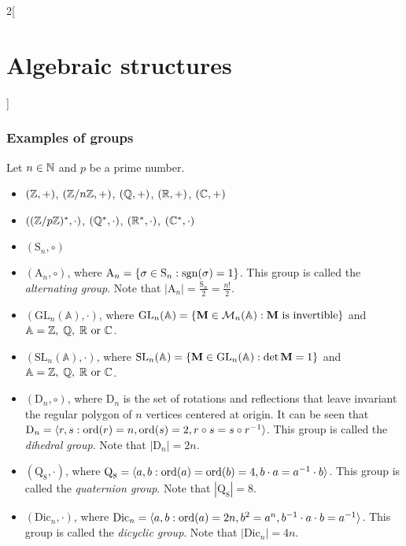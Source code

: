 \documentclass[../../../main_math.tex]{subfiles}
\begin{document}
\begin{multicols}{2}[\section{Algebraic structures}]
  \subsubsection{Examples of groups}\label{AS:examples}
  Let $n\in\mathbb{N}$ and $p$ be a prime number.
  \begin{itemize}
    \item $(\mathbb{Z},+)$, $(\mathbb{Z}/n\mathbb{Z},+)$, $(\mathbb{Q},+)$, $(\mathbb{R},+)$, $(\mathbb{C},+)$
    \item $((\mathbb{Z}/p\mathbb{Z})^*,\cdot)$, $(\mathbb{Q}^*,\cdot)$, $(\mathbb{R}^*,\cdot)$, $(\mathbb{C}^*,\cdot)$
    \item $(\text{S}_n,\circ)$
    \item $(\text{A}_n,\circ)$, where $\text{A}_n=\{\sigma\in \text{S}_n:\operatorname{sgn}(\sigma)=1\}$. This group is called the \emph{alternating group}. Note that $|\text{A}_n|=\frac{\text{S}_n}{2}=\frac{n!}{2}$.
    \item $(\text{GL}_n(\mathbb{A}),\cdot)$, where $\text{GL}_n(\mathbb{A})=\{\boldsymbol{\mathrm{M}}\in\mathcal{M}_n(\mathbb{A}):\boldsymbol{\mathrm{M}}\text{ is invertible}\}$ and $\mathbb{A}=\mathbb{Z},\;\mathbb{Q},\;\mathbb{R}\text{ or }\mathbb{C}$.
    \item $(\text{SL}_n(\mathbb{A}),\cdot)$, where $\text{SL}_n(\mathbb{A})=\{\boldsymbol{\mathrm{M}}\in\text{GL}_n(\mathbb{A}):\det\boldsymbol{\mathrm{M}}=1\}$ and $\mathbb{A}=\mathbb{Z},\;\mathbb{Q},\;\mathbb{R}\text{ or }\mathbb{C}$.
    \item $(\text{D}_n,\circ)$, where $\text{D}_n$ is the set of rotations and reflections that leave invariant the regular polygon of $n$ vertices centered at origin. It can be seen that $\text{D}_n=\langle r,s:\operatorname{ord}(r)=n,\operatorname{ord}(s)=2,r\circ s=s\circ r^{-1}\rangle$. This group is called the \emph{dihedral group}. Note that $|\text{D}_n|=2n$.
    \item $(\text{Q}_8,\cdot)$, where $\text{Q}_8=\langle a,b:\operatorname{ord}(a)=\operatorname{ord}(b)=4,b\cdot a=a^{-1}\cdot b\rangle$. This group is called the \emph{quaternion group}. Note that $|\text{Q}_8|=8$.
    \item $(\text{Dic}_n,\cdot)$, where $\text{Dic}_n=\langle a,b:\operatorname{ord}(a)=2n,b^2=a^n,b^{-1}\cdot a\cdot b=a^{-1}\rangle$. This group is called the \emph{dicyclic group}. Note that $|\text{Dic}_n|=4n$.
  \end{itemize}

\end{multicols}
\end{document}
